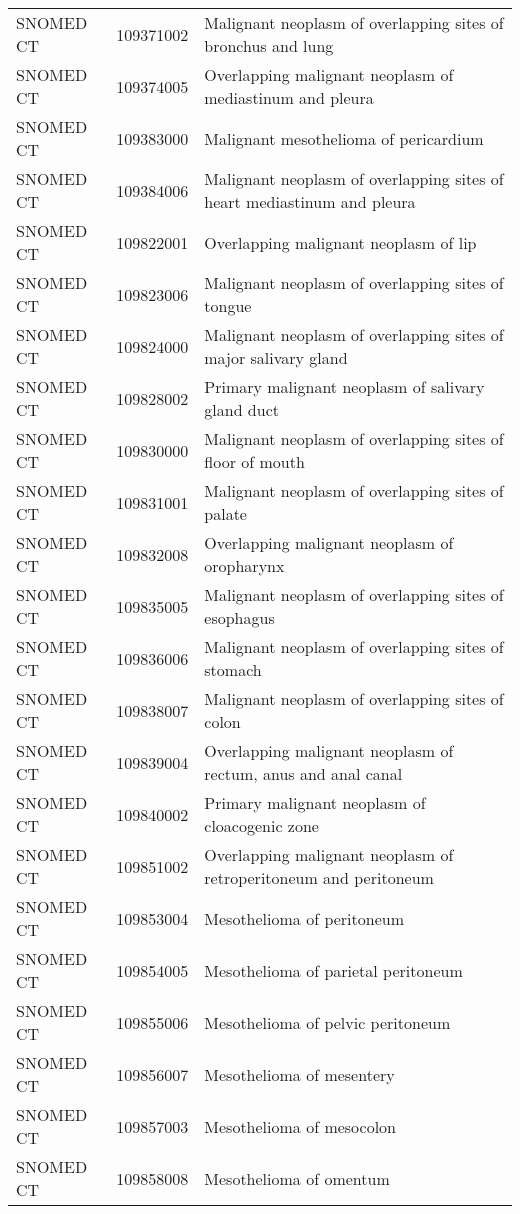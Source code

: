\begin{longtable}{p{}p{}p{}}
  SNOMED CT & 109371002 & Malignant neoplasm of overlapping sites of bronchus and lung \\ 
  SNOMED CT & 109374005 & Overlapping malignant neoplasm of mediastinum and pleura \\ 
  SNOMED CT & 109383000 & Malignant mesothelioma of pericardium \\ 
  SNOMED CT & 109384006 & Malignant neoplasm of overlapping sites of heart mediastinum and pleura \\ 
  SNOMED CT & 109822001 & Overlapping malignant neoplasm of lip \\ 
  SNOMED CT & 109823006 & Malignant neoplasm of overlapping sites of tongue \\ 
  SNOMED CT & 109824000 & Malignant neoplasm of overlapping sites of major salivary gland \\ 
  SNOMED CT & 109828002 & Primary malignant neoplasm of salivary gland duct \\ 
  SNOMED CT & 109830000 & Malignant neoplasm of overlapping sites of floor of mouth \\ 
  SNOMED CT & 109831001 & Malignant neoplasm of overlapping sites of palate \\ 
  SNOMED CT & 109832008 & Overlapping malignant neoplasm of oropharynx \\ 
  SNOMED CT & 109835005 & Malignant neoplasm of overlapping sites of esophagus \\ 
  SNOMED CT & 109836006 & Malignant neoplasm of overlapping sites of stomach \\ 
  SNOMED CT & 109838007 & Malignant neoplasm of overlapping sites of colon \\ 
  SNOMED CT & 109839004 & Overlapping malignant neoplasm of rectum, anus and anal canal \\ 
  SNOMED CT & 109840002 & Primary malignant neoplasm of cloacogenic zone \\ 
  SNOMED CT & 109851002 & Overlapping malignant neoplasm of retroperitoneum and peritoneum \\ 
  SNOMED CT & 109853004 & Mesothelioma of peritoneum \\ 
  SNOMED CT & 109854005 & Mesothelioma of parietal peritoneum \\ 
  SNOMED CT & 109855006 & Mesothelioma of pelvic peritoneum \\ 
  SNOMED CT & 109856007 & Mesothelioma of mesentery \\ 
  SNOMED CT & 109857003 & Mesothelioma of mesocolon \\ 
  SNOMED CT & 109858008 & Mesothelioma of omentum \\ 

\end{longtable}
